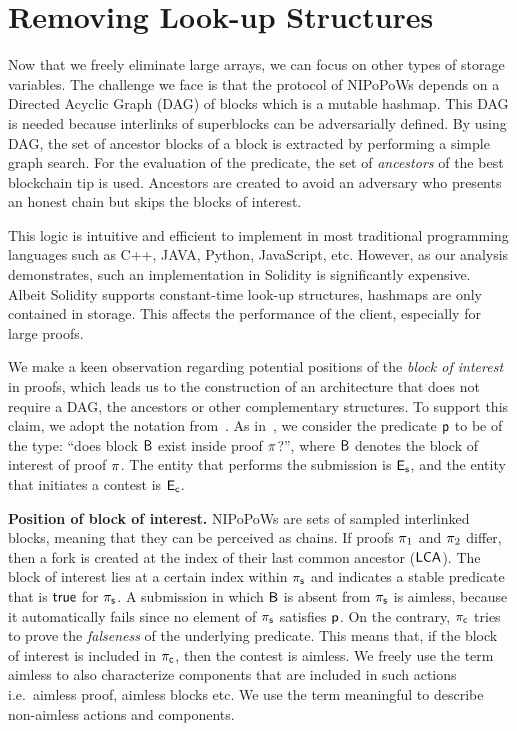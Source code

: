 \section{Removing Look-up Structures}

Now that we freely eliminate large arrays, we can focus on other
types of storage variables. The challenge we face is that the protocol of
NIPoPoWs depends on a Directed Acyclic Graph (DAG) of blocks which is a
mutable hashmap. This DAG is needed because interlinks of superblocks can be
adversarially defined. By using DAG, the set of ancestor blocks of a block is
extracted by performing a simple graph search. For the evaluation of the
predicate, the set of \emph{ancestors} of the best blockchain tip is used.
Ancestors are created to avoid an adversary who presents an honest chain but
skips the blocks of interest.

This logic is intuitive and efficient to implement in most traditional
programming languages such as C++, JAVA, Python, JavaScript, etc. However, as
our analysis demonstrates, such an implementation in Solidity is significantly
expensive. Albeit Solidity supports constant-time look-up structures, hashmaps
are only contained in storage. This affects the performance of the client,
especially for large proofs.

We make a keen observation regarding potential positions of the \emph{block of
interest} in proofs, which leads us to the construction of an architecture that
does not require a DAG, the ancestors or other complementary structures. To
support this claim, we adopt the notation from~\cite{nipopows}. As
in~\cite{nipopows}, we consider the predicate $\mathsf{p}$ to be of the type: ``does
block $\mathsf{B}$ exist inside proof $\mathsf{\pi}$?'', where $\mathsf{B}$ denotes the block of
interest of proof $\mathsf{\pi}$. The entity that performs the submission is $\mathsf{E_{s}}$, and
the entity that initiates a contest is $\mathsf{E_{c}}$.

\noindent \textbf{Position of block of interest.} NIPoPoWs are sets of sampled
interlinked blocks, meaning that they can be perceived as chains. If proofs
$\mathsf{\pi}_1$ and $\mathsf{\pi}_2$ differ, then a fork is created at the index of
their last common ancestor ($\mathsf{LCA}$). The block of interest lies at a certain
index within $\mathsf{\pi_{s}}$ and indicates a stable predicate~\cite{nipopows,
generic-client} that is $\textsf{true}$ for $\mathsf{\pi_{s}}$. A submission in which $\mathsf{B}$ is
absent from $\mathsf{\pi_{s}}$ is aimless, because it automatically fails since no element
of $\mathsf{\pi_{s}}$ satisfies $\mathsf{p}$. On the contrary, $\mathsf{\pi_{c}}$ tries to prove the
\emph{falseness} of the underlying predicate. This means that, if the block of
interest is included in $\mathsf{\pi_{c}}$, then the contest is aimless. We freely use the
term aimless to also characterize components that are included in such actions
i.e.\ aimless proof, aimless blocks etc. We use the term meaningful to describe
non-aimless actions and components.

